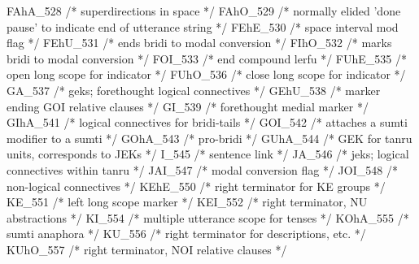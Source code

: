 FAhA_528         /*        superdirections in space */
FAhO_529         /*        normally elided 'done pause' to indicate end
                                   of utterance string */
FEhE_530         /*        space interval mod flag */
FEhU_531         /*        ends bridi to modal conversion */
FIhO_532         /*        marks bridi to modal conversion */
FOI_533          /*        end compound lerfu */
FUhE_535         /*        open long scope for indicator */
FUhO_536         /*        close long scope for indicator */
GA_537           /*        geks; forethought logical connectives */
GEhU_538         /*        marker ending GOI relative clauses */
GI_539           /*        forethought medial marker */
GIhA_541         /*        logical connectives for bridi-tails */
GOI_542          /*        attaches a sumti modifier to a sumti */
GOhA_543         /*        pro-bridi */
GUhA_544         /*        GEK for tanru units, corresponds to JEKs */
I_545            /*        sentence link */
JA_546           /*        jeks; logical connectives within tanru */
JAI_547          /*        modal conversion flag */
JOI_548          /*        non-logical connectives */
KEhE_550         /*        right terminator for KE groups */
KE_551           /*        left long scope marker */
KEI_552          /*        right terminator, NU abstractions */
KI_554           /*        multiple utterance scope for tenses */
KOhA_555         /*        sumti anaphora */
KU_556           /*        right terminator for descriptions, etc. */
KUhO_557         /*        right terminator, NOI relative clauses */

